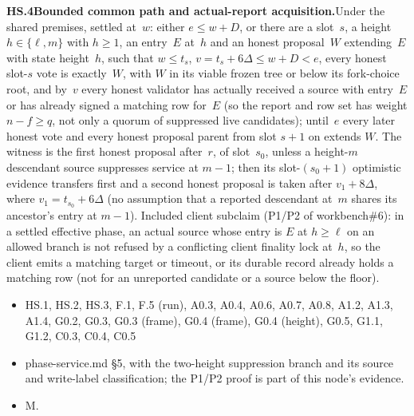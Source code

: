 \documentclass{article}
\newcommand{\dagnode}[6]{%
\par\medskip\noindent\textbf{#1\enspace #2.}\enspace #3
\begin{itemize}[leftmargin=2.2em,itemsep=0pt,topsep=2pt]
\item[\emph{Uses}] #4
\item[\emph{Evid.}] #5
\item[\emph{Task}] #6
\end{itemize}}
\begin{document}
\dagnode{HS.4}{Bounded common path and actual-report acquisition}{Under the
shared premises, settled at~$w$: either $e\leq w+D$, or there are a slot~$s$,
a height $h\in\{\ell,m\}$ with $h\geq1$, an entry~$E$ at~$h$ and an honest
proposal~$W$ extending~$E$ with state height~$h$, such that $w\leq t_s$,
$v=t_s+6\Delta\leq w+D<e$, every honest slot-$s$ vote is exactly~$W$, with $W$
in its viable frozen tree or below its fork-choice root, and by~$v$ every
honest validator has actually received a source with entry~$E$ or has already
signed a matching row for~$E$ (so the report and row set has weight
$n-f\geq q$, not only a quorum of suppressed live candidates); until~$e$ every
later honest vote and every honest proposal parent from slot $s+1$ on extends
$W$.  The witness is the first honest proposal after~$r$, of slot~$s_0$,
unless a height-$m$ descendant source suppresses service at $m-1$; then its
slot-$(s_0+1)$ optimistic evidence transfers first and a second honest
proposal is taken after $v_1+8\Delta$, where $v_1=t_{s_0}+6\Delta$ (no assumption that a reported
descendant at~$m$ shares its ancestor's entry at $m-1$).  Included client
subclaim (P1/P2 of workbench\#6): in a settled effective phase, an actual
source whose entry is $E$ at $h\geq\ell$ on an allowed branch is not refused
by a conflicting client finality lock at~$h$, so the client emits a matching
target or timeout, or its durable record already holds a matching row (not
for an unreported candidate or a source below the floor).}
{HS.1, HS.2, HS.3, F.1, F.5 (run), A0.3, A0.4, A0.6, A0.7, A0.8, A1.2, A1.3,
A1.4, G0.2, G0.3, G0.3 (frame), G0.4 (frame), G0.4 (height), G0.5, G1.1,
G1.2, C0.3, C0.4, C0.5}{phase-service.md \S5, with the two-height suppression
branch and its source and write-label classification; the P1/P2 proof is
part of this node's evidence.}{M.}
\end{document}
